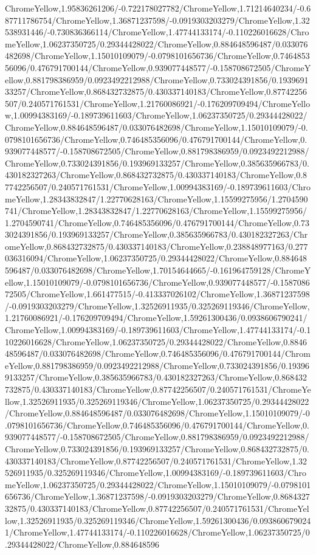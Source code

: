 {\begin{tikzternal}
ChromeYellow,1.95836261206/-0.722178027782/ChromeYellow,1.71214640234/-0.687711786754/ChromeYellow,1.36871237598/-0.0919303203279/ChromeYellow,1.32538931446/-0.730836366114/ChromeYellow,1.47744133174/-0.110226016628/ChromeYellow,1.06237350725/0.29344428022/ChromeYellow,0.884648596487/0.033076482698/ChromeYellow,1.15010109079/-0.0798101656736/ChromeYellow,0.746485356096/0.476791700144/ChromeYellow,0.939077448577/-0.158708672505/ChromeYellow,0.881798386959/0.0923492212988/ChromeYellow,0.733024391856/0.193969133257/ChromeYellow,0.868432732875/0.430337140183/ChromeYellow,0.87742256507/0.240571761531/ChromeYellow,1.21760086921/-0.176209709494/ChromeYellow,1.00994383169/-0.189739611603/ChromeYellow,1.06237350725/0.29344428022/ChromeYellow,0.884648596487/0.033076482698/ChromeYellow,1.15010109079/-0.0798101656736/ChromeYellow,0.746485356096/0.476791700144/ChromeYellow,0.939077448577/-0.158708672505/ChromeYellow,0.881798386959/0.0923492212988/ChromeYellow,0.733024391856/0.193969133257/ChromeYellow,0.385635966783/0.430182327263/ChromeYellow,0.868432732875/0.430337140183/ChromeYellow,0.87742256507/0.240571761531/ChromeYellow,1.00994383169/-0.189739611603/ChromeYellow,1.28343832847/1.22770628163/ChromeYellow,1.15599275956/1.2704590741/ChromeYellow,1.28343832847/1.22770628163/ChromeYellow,1.15599275956/1.2704590741/ChromeYellow,0.746485356096/0.476791700144/ChromeYellow,0.733024391856/0.193969133257/ChromeYellow,0.385635966783/0.430182327263/ChromeYellow,0.868432732875/0.430337140183/ChromeYellow,0.238848977163/0.277036316094/ChromeYellow,1.06237350725/0.29344428022/ChromeYellow,0.884648596487/0.033076482698/ChromeYellow,1.70154644665/-0.161964759128/ChromeYellow,1.15010109079/-0.0798101656736/ChromeYellow,0.939077448577/-0.158708672505/ChromeYellow,1.661477515/-0.413337026102/ChromeYellow,1.36871237598/-0.0919303203279/ChromeYellow,1.32526911935/0.325269119346/ChromeYellow,1.21760086921/-0.176209709494/ChromeYellow,1.59261300436/0.0938606790241/ChromeYellow,1.00994383169/-0.189739611603/ChromeYellow,1.47744133174/-0.110226016628/ChromeYellow,1.06237350725/0.29344428022/ChromeYellow,0.884648596487/0.033076482698/ChromeYellow,0.746485356096/0.476791700144/ChromeYellow,0.881798386959/0.0923492212988/ChromeYellow,0.733024391856/0.193969133257/ChromeYellow,0.385635966783/0.430182327263/ChromeYellow,0.868432732875/0.430337140183/ChromeYellow,0.87742256507/0.240571761531/ChromeYellow,1.32526911935/0.325269119346/ChromeYellow,1.06237350725/0.29344428022/ChromeYellow,0.884648596487/0.033076482698/ChromeYellow,1.15010109079/-0.0798101656736/ChromeYellow,0.746485356096/0.476791700144/ChromeYellow,0.939077448577/-0.158708672505/ChromeYellow,0.881798386959/0.0923492212988/ChromeYellow,0.733024391856/0.193969133257/ChromeYellow,0.868432732875/0.430337140183/ChromeYellow,0.87742256507/0.240571761531/ChromeYellow,1.32526911935/0.325269119346/ChromeYellow,1.00994383169/-0.189739611603/ChromeYellow,1.06237350725/0.29344428022/ChromeYellow,1.15010109079/-0.0798101656736/ChromeYellow,1.36871237598/-0.0919303203279/ChromeYellow,0.868432732875/0.430337140183/ChromeYellow,0.87742256507/0.240571761531/ChromeYellow,1.32526911935/0.325269119346/ChromeYellow,1.59261300436/0.0938606790241/ChromeYellow,1.47744133174/-0.110226016628/ChromeYellow,1.06237350725/0.29344428022/ChromeYellow,0.884648596
\end{tikzternal}}
